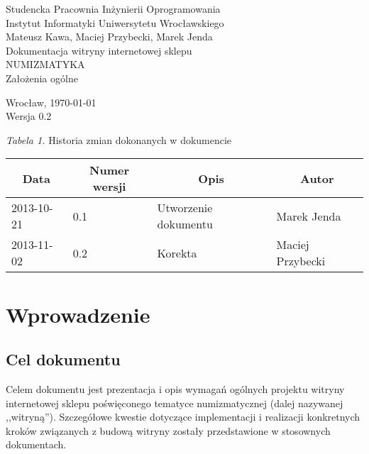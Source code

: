 \documentclass [11pt, a4paper, leqno]	{article}	%
\begin{document}

\begin{center}
	\thispagestyle{empty} 							%
	{\large Studencka Pracownia Inżynierii Oprogramowania} 		\\ [0.5cm]
	{\large Instytut Informatyki Uniwersytetu Wrocławskiego} 	\\ [6.0cm]

	{\large Mateusz Kawa, Maciej Przybecki, Marek Jenda} 		\\ [1.5cm]

	{\huge Dokumentacja witryny internetowej sklepu} 			\\ [0.5cm]
	{\huge NUMIZMATYKA} 										\\ [1.5cm]

	{\large Założenia ogólne} 									\\ [0.5cm]

	\vfill
	
	{\large Wrocław, \today}									\\ [0.5cm]
	{\large Wersja 0.2}
\end{center}

\newpage


\textit{Tabela 1.} Historia zmian dokonanych w dokumencie

\begin{center}
	\begin{tabular}{| l | l | l | l |}
		\hline
		\multicolumn{1}{|c|}{Data} & 
		\multicolumn{1}{|c|}{Numer wersji} &  
		\multicolumn{1}{|c|}{Opis} &
		\multicolumn{1}{|c|}{Autor} \\ \hline \hline
		2013-10-21 & 0.1 & Utworzenie dokumentu & Marek Jenda \\ \hline
		2013-11-02 & 0.2 & Korekta & Maciej Przybecki \\ \hline
	\end{tabular}
\end{center}

\newpage


\tableofcontents

\newpage

\section{Wprowadzenie}

\subsection{Cel dokumentu}
\noindent
Celem  dokumentu jest prezentacja i opis wymagań ogólnych projektu witryny internetowej sklepu poświęconego tematyce numizmatycznej (dalej nazywanej ,,witryną'').
Szczegółowe kwestie dotyczące implementacji i realizacji konkretnych kroków związanych z budową witryny zostały przedstawione w stosownych dokumentach.
\end{document}
